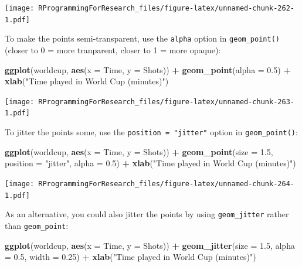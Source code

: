 \documentclass[]{book}
\makeatletter
\newenvironment{Shaded}{\begin{snugshade}}{\end{snugshade}}
\newcommand{\KeywordTok}[1]{\textcolor[rgb]{0.13,0.29,0.53}{\textbf{#1}}}
\newcommand{\DataTypeTok}[1]{\textcolor[rgb]{0.13,0.29,0.53}{#1}}
\newcommand{\FloatTok}[1]{\textcolor[rgb]{0.00,0.00,0.81}{#1}}
\newcommand{\StringTok}[1]{\textcolor[rgb]{0.31,0.60,0.02}{#1}}
\newcommand{\OperatorTok}[1]{\textcolor[rgb]{0.81,0.36,0.00}{\textbf{#1}}}
\newcommand{\NormalTok}[1]{#1}
\newenvironment{kframe}{%
\medskip{}
\setlength{\fboxsep}{.8em}
 \def\at@end@of@kframe{}%
 \ifinner\ifhmode%
  \def\at@end@of@kframe{\end{minipage}}%
  \begin{minipage}{\columnwidth}%
 \fi\fi%
 \def\FrameCommand##1{\hskip\@totalleftmargin \hskip-\fboxsep
 \colorbox{shadecolor}{##1}\hskip-\fboxsep
     \hskip-\linewidth \hskip-\@totalleftmargin \hskip\columnwidth}%
 \MakeFramed {\advance\hsize-\width
   \@totalleftmargin\z@ \linewidth\hsize
   \@setminipage}}%
 {\par\unskip\endMakeFramed%
 \at@end@of@kframe}
\renewenvironment{Shaded}{\begin{kframe}}{\end{kframe}}
\theoremstyle{definition}
\theoremstyle{definition}
\theoremstyle{definition}
\theoremstyle{remark}
\makeatother
\begin{document}
\texttt{[image: RProgrammingForResearch\_files/figure-latex/unnamed-chunk-262-1.pdf]}

To make the points semi-transparent, use the \texttt{alpha} option in
\texttt{geom\_point()} (closer to 0 = more tranparent, closer to 1 =
more opaque):

\begin{Shaded}
\begin{Highlighting}[]
\KeywordTok{ggplot}\NormalTok{(worldcup, }\KeywordTok{aes}\NormalTok{(}\DataTypeTok{x =}\NormalTok{ Time, }\DataTypeTok{y =}\NormalTok{ Shots)) }\OperatorTok{+}
\StringTok{        }\KeywordTok{geom_point}\NormalTok{(}\DataTypeTok{alpha =} \FloatTok{0.5}\NormalTok{)  }\OperatorTok{+}\StringTok{ }
\StringTok{        }\KeywordTok{xlab}\NormalTok{(}\StringTok{"Time played in World Cup (minutes)"}\NormalTok{)}
\end{Highlighting}
\end{Shaded}

\texttt{[image: RProgrammingForResearch\_files/figure-latex/unnamed-chunk-263-1.pdf]}

To jitter the points some, use the \texttt{position\ =\ "jitter"} option
in \texttt{geom\_point()}:

\begin{Shaded}
\begin{Highlighting}[]
\KeywordTok{ggplot}\NormalTok{(worldcup, }\KeywordTok{aes}\NormalTok{(}\DataTypeTok{x =}\NormalTok{ Time, }\DataTypeTok{y =}\NormalTok{ Shots)) }\OperatorTok{+}
\StringTok{        }\KeywordTok{geom_point}\NormalTok{(}\DataTypeTok{size =} \FloatTok{1.5}\NormalTok{, }\DataTypeTok{position =} \StringTok{"jitter"}\NormalTok{,}
                   \DataTypeTok{alpha =} \FloatTok{0.5}\NormalTok{)  }\OperatorTok{+}\StringTok{ }
\StringTok{        }\KeywordTok{xlab}\NormalTok{(}\StringTok{"Time played in World Cup (minutes)"}\NormalTok{)}
\end{Highlighting}
\end{Shaded}

\texttt{[image: RProgrammingForResearch\_files/figure-latex/unnamed-chunk-264-1.pdf]}

As an alternative, you could also jitter the points by using
\texttt{geom\_jitter} rather than \texttt{geom\_point}:

\begin{Shaded}
\begin{Highlighting}[]
\KeywordTok{ggplot}\NormalTok{(worldcup, }\KeywordTok{aes}\NormalTok{(}\DataTypeTok{x =}\NormalTok{ Time, }\DataTypeTok{y =}\NormalTok{ Shots)) }\OperatorTok{+}
\StringTok{        }\KeywordTok{geom_jitter}\NormalTok{(}\DataTypeTok{size =} \FloatTok{1.5}\NormalTok{, }\DataTypeTok{alpha =} \FloatTok{0.5}\NormalTok{, }\DataTypeTok{width =} \FloatTok{0.25}\NormalTok{)  }\OperatorTok{+}\StringTok{ }
\StringTok{        }\KeywordTok{xlab}\NormalTok{(}\StringTok{"Time played in World Cup (minutes)"}\NormalTok{)}
\end{Highlighting}
\end{Shaded}
\end{document}
